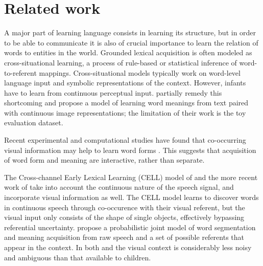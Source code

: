\section{Related work}
A major part of learning language consists in learning its structure,
but in order to be able to communicate it is also of crucial importance
to learn the relation of words to entities in the
world.
Grounded lexical acquisition is often modeled as cross-situational
learning, a process of rule-based \cite{siskind.96} or statistical
\cite{fazly.etal.10csj,frank.etal.07} inference of word-to-referent
mappings.
Cross-situational models typically work on word-level language input
and symbolic representations of the context. However, infants have to
learn from continuous perceptual input. 
 partially remedy this shortcoming
and propose a model of learning word
meanings from text paired with continuous image representations; the
limitation of their work is the toy evaluation dataset.

Recent experimental and computational studies have found that co-occurring visual information may help to learn word forms \cite{thiessen2010effects,Cunillera2010295,Glicksohn2013,Yurofsky2012statistical}. This suggests that acquisition of word form and meaning are interactive, rather than separate.

The Cross-channel Early Lexical Learning (CELL) model of  and the more recent work of  take into account the continuous nature of the speech signal, and incorporate visual information as well. The CELL model learns to discover words in continuous speech through co-occurence with their visual referent, but the visual input only consists of the shape of single objects, effectively bypassing referential uncertainty.  propose a probabilistic joint model of word segmentation and meaning acquisition from raw speech and a set of possible referents that appear in the context. In both  and  the visual context is considerably less noisy and ambiguous than that available to children.

